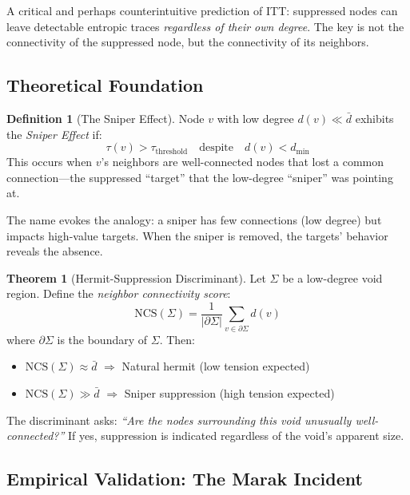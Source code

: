 \documentclass[11pt,a4paper]{article}
\theoremstyle{definition}
\newtheorem{definition}{Definition}[section]
\newtheorem{theorem}{Theorem}[section]
\theoremstyle{remark}
\begin{document}
A critical and perhaps counterintuitive prediction of ITT: suppressed nodes can leave detectable entropic traces \emph{regardless of their own degree}. The key is not the connectivity of the suppressed node, but the connectivity of its neighbors.

\subsection{Theoretical Foundation}

\begin{definition}[The Sniper Effect]
\label{def:sniper}
Node $v$ with low degree $d(v) \ll \bar{d}$ exhibits the \emph{Sniper Effect} if:
\begin{equation}
    \tau(v) > \tau_{\text{threshold}} \quad \text{despite} \quad d(v) < d_{\min}
\end{equation}
This occurs when $v$'s neighbors are well-connected nodes that lost a common connection---the suppressed ``target'' that the low-degree ``sniper'' was pointing at.
\end{definition}

The name evokes the analogy: a sniper has few connections (low degree) but impacts high-value targets. When the sniper is removed, the targets' behavior reveals the absence.

\begin{theorem}[Hermit-Suppression Discriminant]
\label{thm:hermit}
Let $\Sigma$ be a low-degree void region. Define the \emph{neighbor connectivity score}:
\begin{equation}
    \text{NCS}(\Sigma) = \frac{1}{|\partial\Sigma|} \sum_{v \in \partial\Sigma} d(v)
\end{equation}
where $\partial\Sigma$ is the boundary of $\Sigma$. Then:
\begin{itemize}
    \item $\text{NCS}(\Sigma) \approx \bar{d}$ $\Rightarrow$ Natural hermit (low tension expected)
    \item $\text{NCS}(\Sigma) \gg \bar{d}$ $\Rightarrow$ Sniper suppression (high tension expected)
\end{itemize}
\end{theorem}

The discriminant asks: \emph{``Are the nodes surrounding this void unusually well-connected?''} If yes, suppression is indicated regardless of the void's apparent size.

\subsection{Empirical Validation: The Marak Incident}
\end{document}
